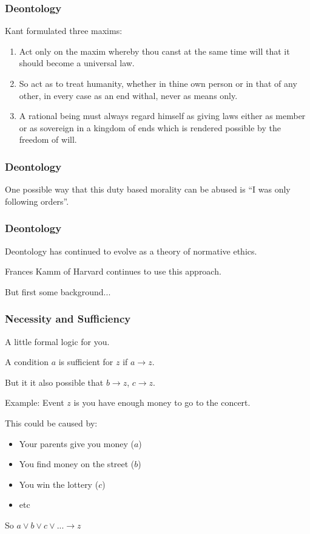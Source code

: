 \begin{frame}
\frametitle{Deontology}

Kant formulated three maxims:

\begin{enumerate}
\item Act only on the maxim whereby thou canst at the same time will that it should become a universal law.

\item So act as to treat humanity, whether in thine own person or in that of any other, in every case as an end withal, never as means only.

\item A rational being must always regard himself as giving laws either as member or as sovereign in a kingdom of ends which is rendered possible by the freedom of will.
\end{enumerate}

\end{frame}

\begin{frame}
\frametitle{Deontology}

One possible way that this duty based morality can be abused is ``I was only following orders''.

\end{frame}


\begin{frame}
\frametitle{Deontology}

Deontology has continued to evolve as a theory of normative ethics.

	Frances Kamm of Harvard continues to use this approach.

But first some background...

\end{frame}



\begin{frame}
\frametitle{Necessity and Sufficiency}

A little formal logic for you.

A condition $a$ is sufficient for $z$ if $a \rightarrow z$.

But it it also possible that $b \rightarrow z$, $c \rightarrow z$.

Example: Event $z$ is you have enough money to go to the concert. 

This could be caused by:

\begin{itemize}
	\item Your parents give you money ($a$)
	\item You find money on the street ($b$)
	\item You win the lottery ($c$)
	\item etc
\end{itemize}

So $ a \vee b \vee c \vee ... \rightarrow z$

\end{frame}



